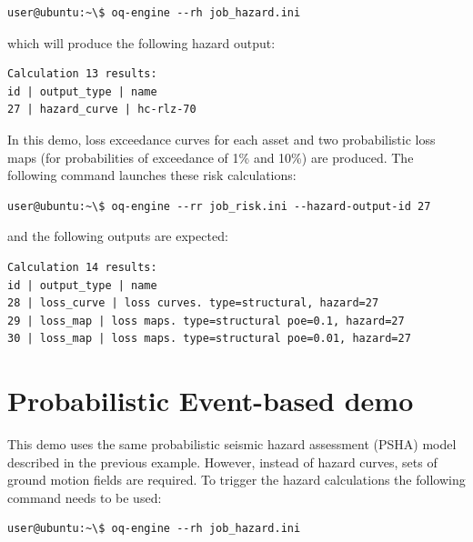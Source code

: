 \begin{Verbatim}[frame=single, commandchars=\\\{\}, samepage=true]
user@ubuntu:~\$ oq-engine --rh job_hazard.ini
\end{Verbatim}

which will produce the following hazard output:

\begin{Verbatim}[frame=single, commandchars=\\\{\}, samepage=true]
Calculation 13 results:
id | output_type | name
27 | hazard_curve | hc-rlz-70
\end{Verbatim}

In this demo, loss exceedance curves for each asset and two probabilistic loss maps (for probabilities of exceedance of 1\% and 10\%) are produced. The following command launches these risk calculations:

\begin{Verbatim}[frame=single, commandchars=\\\{\}, samepage=true]
user@ubuntu:~\$ oq-engine --rr job_risk.ini --hazard-output-id 27
\end{Verbatim}

and the following outputs are expected:

\begin{Verbatim}[frame=single, commandchars=\\\{\}, samepage=true]
Calculation 14 results:
id | output_type | name
28 | loss_curve | loss curves. type=structural, hazard=27
29 | loss_map | loss maps. type=structural poe=0.1, hazard=27
30 | loss_map | loss maps. type=structural poe=0.01, hazard=27
\end{Verbatim}

\section{Probabilistic Event-based demo}
This demo uses the same probabilistic seismic hazard assessment (PSHA) model described in the previous example. However, instead of hazard curves, sets of ground motion fields are required. To trigger the hazard calculations the following command needs to be used:

\begin{Verbatim}[frame=single, commandchars=\\\{\}, samepage=true]
user@ubuntu:~\$ oq-engine --rh job_hazard.ini
\end{Verbatim}

